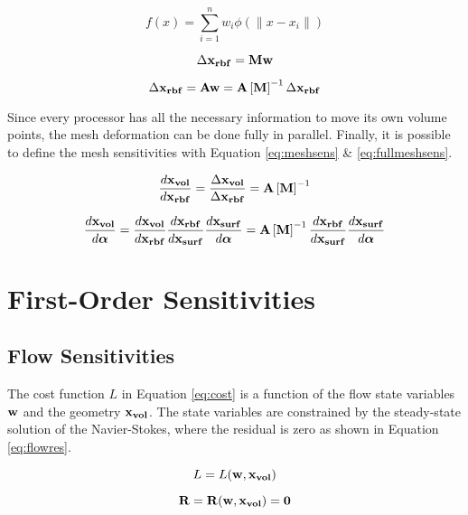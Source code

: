 \documentclass[letterpaper,12pt,]{article}
\begin{document}
\begin{equation}
	f(x) = \sum_{i=1}^n w_i \phi(\|x - x_i\|)
	\label{eq:rbf}
\end{equation}

\begin{equation}
	\Delta \mathbf{x_{rbf}}
		= \mathbf{M} 
		  \mathbf{w}
	\label{eq:solveRBF}
\end{equation}


\begin{equation}
	\Delta \mathbf{x_{rbf}} 
		= \mathbf{A} 
		  \mathbf{w}
		= \mathbf{A}
		  \left[\mathbf{M}\right]^{-1}
		  \Delta \mathbf{x_{rbf}}
	\label{eq:disprbf}
\end{equation}

Since every processor has all the necessary information to move its own volume points, the mesh deformation can be done fully in parallel.
Finally, it is possible to define the mesh sensitivities with Equation \ref{eq:meshsens} \& \ref{eq:fullmeshsens}.

\begin{equation}
	\dfrac{d\mathbf{x_{vol}}}{d\mathbf{x_{rbf}}}
	= \dfrac{\Delta \mathbf{x_{vol}}}{\Delta \mathbf{x_{rbf}}}
		= \mathbf{A}
		  \left[\mathbf{M}\right]^{-1}
	\label{eq:meshsens}
\end{equation}

\begin{equation}
	\dfrac{d\mathbf{x_{vol}}}{d\boldsymbol{\alpha}}
	=
	\dfrac{d\mathbf{x_{vol}}}{d\mathbf{x_{rbf}}}
	\dfrac{d\mathbf{x_{rbf}}}{d\mathbf{x_{surf}}}
	\dfrac{d\mathbf{x_{surf}}}{d\boldsymbol{\alpha}}
	=
	\mathbf{A}
	\left[\mathbf{M}\right]^{-1}
	\dfrac{d\mathbf{x_{rbf}}}{d\mathbf{x_{surf}}}
	\dfrac{d\mathbf{x_{surf}}}{d\boldsymbol{\alpha}}
	\label{eq:fullmeshsens}
\end{equation}

\section*{First-Order Sensitivities}

\subsection*{Flow Sensitivities}

The cost function $L$ in Equation \ref{eq:cost} is a function of the flow state variables $\mathbf{w}$ and the geometry $\mathbf{x_{vol}}$.
The state variables are constrained by the steady-state solution of the Navier-Stokes, where the residual is zero as shown in Equation \ref{eq:flowres}.

\begin{equation}
	L = L(\mathbf{w}, \mathbf{x_{vol}})
	\label{eq:cost}
\end{equation}

\begin{equation}
	\mathbf{R} = \mathbf{R}(\mathbf{w}, \mathbf{x_{vol}}) = \mathbf{0}
	\label{eq:flowres}
\end{equation}
\end{document}
